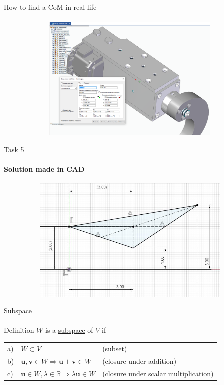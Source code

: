 \documentclass[aspectratio=169,notes]{beamer}
\begin{document}
\begin{frame}[t]{How to find a CoM in real life}
    \framesubtitle{}
    \vspace{-0.3cm}
    \begin{figure}[H]
        \centering\includegraphics[height=6cm,width=1\textwidth,keepaspectratio]{resources/image37.png}
        \label{fig:resources/image37.png}
    \end{figure}
\end{frame}

\begin{frame}[t]{Task 5}
    \framesubtitle{Solution made in CAD}
    \vspace{-0.6cm}
    \begin{figure}[H]
        \centering\includegraphics[height=6cm,width=1\textwidth,keepaspectratio]{resources/image39.png}
        \label{fig:resources/image39.png}
    \end{figure}
\end{frame}

\begin{frame}[t]{Subspace}
    \framesubtitle{}
    \begin{exampleblock}{Definition}
        $W$ is a \underline{subspace} of $V$ if

        \begin{tabular}{lll}
            a) & $W \subset V$                                                                 & (subset)                 \\
            b) & $\mathbf{u},\mathbf{v}\in W \Rightarrow \mathbf{u}+\mathbf{v} \in W$          & (closure under addition) \\
            c) & $\mathbf{u}\in W, \lambda \in \mathbb{R} \Rightarrow \lambda \mathbf{u}\in W$ &
            (closure under scalar multiplication)
        \end{tabular}
    \end{exampleblock}
\end{frame}
\end{document}
